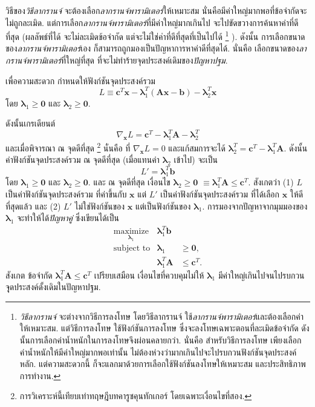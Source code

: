 \begin{Exercise}
วิธีของ\textit{วิธีลากรานจ์} จะต้องเลือก\textit{ลากรานจ์พารามิเตอร์}ให้เหมาะสม
นั่นคือมีค่าใหญ่มากพอที่ข้อจำกัดจะไม่ถูกละเมิด.
แต่การเลือก\textit{ลากรานจ์พารามิเตอร์}ที่มีค่าใหญ่มากเกินไป จะไปขัดขวางการค้นหาค่าที่ดีที่สุด (ผลลัพธ์ที่ได้ จะไม่ละเมิดข้อจำกัด แต่จะไม่ใช่ค่าที่ดีที่สุดที่เป็นไปได้%
\footnote{%
\textit{วิธีลากรานจ์} จะต่างจากวิธีการลงโทษ
โดยวิธีลากรานจ์ ใช้\textit{ลากรานจ์พารามิเตอร์}และต้องเลือกค่าให้เหมาะสม.
แต่วิธีการลงโทษ ใช้ฟังก์ชันการลงโทษ ซึ่งจะลงโทษเฉพาะตอนที่ละเมิดข้อจำกัด
ดังนั้นการเลือกค่าน้ำหนักในการลงโทษจึงผ่อนคลายกว่า.
นั่นคือ สำหรับวิธีการลงโทษ 
เพียงเลือกค่าน้ำหนักให้มีค่าใหญ่มากพอเท่านั้น ไม่ต้องห่วงว่ามากเกินไปจะไปรบกวนฟังก์ชันจุดประสงค์หลัก.
แต่ความสะดวกนี้ ก็จะแลกมาด้วยการเลือกใช้ฟังก์ชันลงโทษให้เหมาะสม และประสิทธิภาพการทำงาน.
}%
).
ดังนั้น 
การเลือกขนาดของ\textit{ลากรานจ์พารามิเตอร์}เอง ก็สามารถถูกมองเป็นปัญหาการหาค่าดีที่สุดได้.
นั่นคือ เลือกขนาดของ\textit{ลากรานจ์พารามิเตอร์}ที่ใหญ่ที่สุด ที่จะไม่ทำร้ายจุดประสงค์เดิมของ\textit{ปัญหาปฐม}.



เพื่อความสะดวก กำหนดให้ฟังก์ชันจุดประสงค์รวม 
\[
L \equiv \bm{c}^T \bm{x} 
- \bm{\lambda}_1^T (\bm{A} \bm{x} - \bm{b})
- \bm{\lambda}_2^T \bm{x}
\]
โดย $\bm{\lambda}_1 \geq \bm{0}$ และ $\bm{\lambda}_2 \geq \bm{0}$.

ดังนั้นเกรเดียนต์ 
\[
\nabla_{\bm{x}} L = \bm{c}^T - \bm{\lambda}_1^T \bm{A} - \bm{\lambda}_2^T
\]
และเมื่อพิจารณา ณ จุดดีที่สุด%
\footnote{%
การวิเคราะห์นี้เทียบเท่าทฤษฎีบทคารูชคุนทักเกอร์ โดยเฉพาะเงื่อนไขที่สอง.
}
%
นั่นคือ ที่ $\nabla_{\bm{x}} L = 0$ และแก้สมการจะได้ $\bm{\lambda}_2^T = \bm{c}^T - \bm{\lambda}_1^T \bm{A}$.
ดังนั้น 
ค่าฟังก์ชันจุดประสงค์รวม ณ จุดดีที่สุด (เมื่อแทนค่า $\bm{\lambda}_2$ เข้าไป) จะเป็น
\[
L' = \bm{\lambda}_1^T \bm{b}
\]
โดย $\bm{\lambda}_1 \geq \bm{0}$ 
และ $\bm{\lambda}_2 \geq \bm{0}$.
และ ณ จุดดีที่สุด เงื่อนไข $\bm{\lambda}_2 \geq \bm{0}$
$\equiv \bm{\lambda}_1^T \bm{A} \leq \bm{c}^T$.
สังเกตว่า
(1) $L$ เป็นค่าฟังก์ชันจุดประสงค์รวม ที่ค่าขึ้นกับ $\bm{x}$
แต่ $L'$  เป็นค่าฟังก์ชันจุดประสงค์รวม ที่ได้เลือก $\bm{x}$ ให้ดีที่สุดแล้ว
และ (2)
$L'$ ไม่ใช่ฟังก์ชันของ $\bm{x}$ แต่เป็นฟังก์ชันของ $\bm{\lambda}_1$.
การมองจากปัญหาจากมุมมองของ $\bm{\lambda}_1$
จะทำให้ได้\textit{ปัญหาคู่} ซึ่งเขียนได้เป็น
\begin{eqnarray}
\underset{\bm{\lambda}_1}{\mathrm{maximize}} & \bm{\lambda}_1^T \bm{b} & 
\nonumber \\
\mbox{subject to} & \bm{\lambda}_1        & \geq \bm{0},
\nonumber \\
& \bm{\lambda}_1^T \bm{A}        & \leq \bm{c}^T.
\nonumber
\end{eqnarray}
สังเกต 
ข้อจำกัด $\bm{\lambda}_1^T \bm{A} \leq \bm{c}^T$
เปรียบเสมือน เงื่อนไขที่ควบคุมไม่ให้ $\bm{\lambda}_1$ มีค่าใหญ่เกินไปจนไปรบกวนจุุดประสงค์ดั้งเดิมในปัญหาปฐม.


\end{Exercise}

